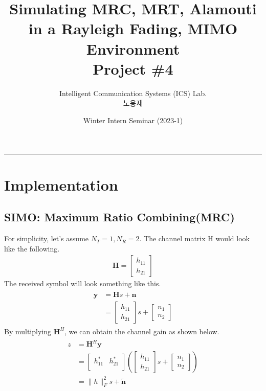 \documentclass{article}
\title{Simulating MRC, MRT, Alamouti\\in a Rayleigh Fading, MIMO Environment\\
\large Project \#4}
\author{Intelligent Communication Systems (ICS) Lab.\\노용재}
\date{Winter Intern Seminar (2023-1)}
\begin{document}
\maketitle
\tableofcontents
\vspace{0.5cm}
\hrule
\vspace{0.5cm}

\section{Implementation}
\subsection{SIMO: Maximum Ratio Combining(MRC)}
For simplicity, let's assume $N_T=1, N_R=2$. The channel matrix H would look like the following.
\begin{gather}
\boldsymbol{H}=
\begin{bmatrix}
h_{11} \\
 h_{21}
\end{bmatrix}
\end{gather}
The received symbol will look something like this.
\begin{gather}
\begin{align}
\boldsymbol{y} &= \boldsymbol{H}s+\boldsymbol{n}\\
&=
\begin{bmatrix}
h_{11} \\
 h_{21}
\end{bmatrix}
s+
\begin{bmatrix}
n_{1}\\ n_{2}
\end{bmatrix}
\end{align}
\end{gather}
By multiplying $\boldsymbol{H}^H$, we can obtain the channel gain as shown below.
\begin{gather}
\begin{align}
z&=\boldsymbol{H}^H\boldsymbol{y}\\
&=\begin{bmatrix}
h_{11}^* & h_{21}^*\\
\end{bmatrix}
(\begin{bmatrix}
h_{11} \\
 h_{21}
\end{bmatrix}
s+
\begin{bmatrix}
n_{1}\\ n_{2}
\end{bmatrix}
)\\
&=\lVert h\rVert_F^2s+\tilde{\boldsymbol{n}}
\end{align}
\end{gather}
\end{document}
